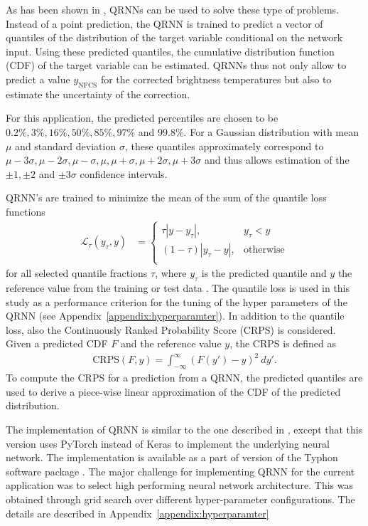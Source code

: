\documentclass[amt, manuscript]{copernicus}
\newcommand{\ynfcs}{y_\text{NFCS}}
\begin{document}
As has been shown in \citet{pfreundschuh:aneur:18}, QRNNs can be used to solve
these type of problems. Instead of a point prediction, the QRNN is trained to
predict a vector of quantiles of the distribution of the target variable
conditional on the network input. Using these predicted quantiles, the cumulative
distribution function (CDF) of the target variable can be estimated. QRNNs thus
not only allow to predict a value $\ynfcs$ for the corrected brightness temperatures
but also to estimate the uncertainty of the correction.

For this application, the predicted percentiles are chosen to be
$0.2\%, 3\%, 16\%, 50\%, 85\%, 97\%$ and $99.8\%$. For a Gaussian
distribution with mean $\mu$ and standard deviation $\sigma$, these quantiles
approximately correspond to $\mu -3\sigma, \mu-2\sigma, \mu-\sigma
, \mu, \mu + \sigma, \mu + 2\sigma, \mu + 3\sigma$ and thus allows
estimation of the $\pm 1, \pm 2$ and $\pm 3\sigma$ confidence intervals.

QRNN's are trained to minimize the mean of the sum of the quantile loss functions
%
\begin{align}
\mathcal{L}_\tau(y_\tau, y) &=
\begin{cases}
\tau|y - y_\tau|, & y_\tau < y \\ (1 - \tau)|y_\tau - y|, & \text{otherwise}
\\
\end{cases}
\end{align}
%
for all selected quantile fractions $\tau$, where $y_\tau$ is the predicted
quantile and $y$ the reference value from the training or test data . The
quantile loss is used in this study as a performance criterion for the tuning of
the hyper parameters of the QRNN (see Appendix~\ref{appendix:hyperparamter}). In
addition to the quantile loss, also the Continuously Ranked Probability Score
(CRPS) is considered. Given a predicted CDF
$F$ and the reference value $y$, the CRPS is defined as
%
\begin{align}
\text{CRPS}(F, y) = \int_{-\infty}^{\infty} \left (F(y') - y\right )^2\: dy'.
\end{align}
%
To compute the CRPS for a prediction from a QRNN, the predicted quantiles are
used to derive a piece-wise linear approximation of the CDF of the predicted
distribution.

The implementation of QRNN is similar to the one described in
\citet{pfreundschuh:aneur:18}, except that this version uses PyTorch
\citep{paszke2017automatic} instead of Keras \citep{chollet2015keras} to
implement the underlying neural network. The implementation is available as a
part of version of the Typhon software package \citep{typhonv08}. The major
challenge for implementing QRNN for the current application was to select high
performing neural network architecture. This was obtained through grid search
over different hyper-parameter configurations. The details are described in
Appendix~\ref{appendix:hyperparamter}
\end{document}
